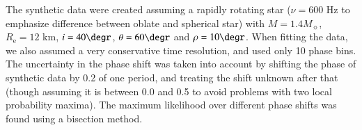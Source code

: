 \documentclass{aa}
\newcommand{\blue}[1]{\textcolor{blue}{#1}}
\newcommand{\req}{R_{\mathrm{e}}}
\newcommand{\msun}{{M}_{\sun}}
\begin{document}
The synthetic data were created assuming a rapidly rotating star ($\nu = 600$ Hz to emphasize difference between oblate and spherical star) with $M = 1.4 \msun$, $\req = 12$ km, $i = 40 \degr$, $\theta = 60 \degr$ and $\rho = 10 \degr$.
When fitting the data, we also assumed a very conservative time resolution, and used only 10 phase bins. 
The uncertainty in the phase shift was taken into account by shifting the phase of synthetic data by 0.2 of one period, and treating the shift unknown after that (though assuming it is between 0.0 and 0.5 to avoid problems with two local probability maxima).
The maximum likelihood over different phase shifts was found using a bisection method.
\end{document}
